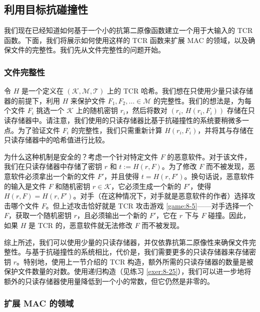 \subsection{利用目标抗碰撞性}\label{subsec:8-11-4}

我们现在已经知道如何基于一个小的抗第二原像函数建立一个用于大输入的 TCR 函数。下面，我们将展示如何使用这样的 TCR 函数来扩展 MAC 的领域，以及确保文件的完整性。我们先从文件完整性的问题开始。

\subsubsection{文件完整性}\label{subsubsec:8-11-4-1}

令 $H$ 是一个定义在 $(\mathcal{K},\mathcal{M},\mathcal{T})$ 上的 TCR 哈希。我们想在只使用少量只读存储器的前提下，利用 $H$ 来保护文件 $F_1,F_2,\dots\in\mathcal{M}$ 的完整性。我们的想法是，为每个文件 $F_i$ 挑选一个 $\mathcal{K}$ 上的随机密钥 $r_i$，然后将数对 $(r_i,\,H(r_i,F_i))$ 存储在只读存储器中。请注意，我们使用的只读存储器比基于抗碰撞性的系统要稍微多一点。为了验证文件 $F_i$ 的完整性，我们只需重新计算 $H(r_i,F_i)$，并将其与存储在只读存储器中的哈希值进行比较。

为什么这种机制是安全的？考虑一个针对特定文件 $F$ 的恶意软件。对于该文件，我们在只读存储器中存储了密钥 $r$ 和 $t:=H(r,F)$。为了修改 $F$ 而不被发现，恶意软件必须拿出一个新的文件 $F'$，并且使得 $t=H(r,F')$。换句话说，恶意软件的输入是文件 $F$ 和随机密钥 $r\in\mathcal{K}$，它必须生成一个新的 $F'$，使得 $H(r,F)=H(r,F')$。对手（在这种情况下，对手就是恶意软件的作者）选择攻击哪个文件 $F$。但上述攻击恰好就是 TCR 攻击游戏 \ref{game:8-5}——对手选择一个 $F$，获取一个随机密钥 $r$，且必须输出一个新的 $F'$，它在 $r$ 下与 $F$ 碰撞。因此，如果 $H$ 是 TCR 	的，恶意软件就无法修改 $F$ 而不被发现。

综上所述，我们可以使用少量的只读存储器，并仅依靠抗第二原像性来确保文件完整性。与基于抗碰撞性的系统相比，代价是，我们需要更多的只读存储器来存储密钥 $r$。特别地，使用上一节介绍的 TCR 构造，额外所需的只读存储器的数量是被保护文件数量的对数。使用递归构造（见练习 \ref{exer:8-25}），我们可以进一步地将额外的只读存储器使用量降低到一个小的常数，但它仍然是非零的。

\subsubsection{扩展 MAC 的领域}\label{subsubsec:8-11-4-2}

